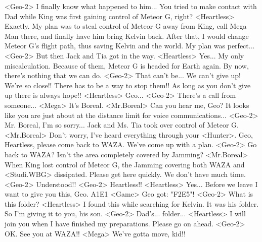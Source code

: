 <Geo-2> I finally know what happened to him... 
You tried to make contact with Dad while King was first 
gaining control of Meteor G, right? 
<Heartless> Exactly. 
My plan was to steal control of Meteor G away from King, 
call Mega Man there, and finally have him bring Kelvin back. 
After that, I would change Meteor G's flight path, thus saving Kelvin and the world. 
My plan was perfect... 
<Geo-2> But then Jack and Tia got in the way. 
<Heartless> Yes... My only miscalculation. 
Because of them, Meteor G is headed for Earth again. 
By now, there's nothing that we can do. 
<Geo-2> That can't be... We can't give up! We're so close!! 
There has to be a way to stop them!! 
As long as you don't give up there is always hope!! 
<Heartless> Geo... 
<Geo-2> There's a call from someone... 
<Mega> It's Boreal. 
<Mr.Boreal> Can you hear me, Geo? 
It looks like you are just about at the distance limit for voice communications... 
<Geo-2> Mr. Boreal, I'm so sorry... 
Jack and Ms. Tia took over control of Meteor G. 
<Mr.Boreal> Don't worry, I've heard everything through your <Hunter>. 
Geo, Heartless, please come back to WAZA. We've come up with a plan. 
<Geo-2> Go back to WAZA? 
Isn't the area completely covered by Jamming? 
<Mr.Boreal> When King lost control of Meteor G, the Jamming 
covering both WAZA and <Studi.WBG> dissipated. 
Please get here quickly. We don't have much time. 
<Geo-2> Understood!! 
<Geo-2> Heartless!! 
<Heartless> Yes... 
Before we leave I want to give you this, Geo. 
{A1}{E1} 
<Game> Geo got: "{F2}{E5}"! 
<Geo-2> What is this folder? 
<Heartless> I found this while searching for Kelvin. 
It was his folder. So I'm giving it to you, his son. 
<Geo-2> Dad's... folder... 
<Heartless> I will join you when I have finished my preparations. 
Please go on ahead. 
<Geo-2> OK. See you at WAZA!! 
<Mega> We've gotta move, kid!! 
